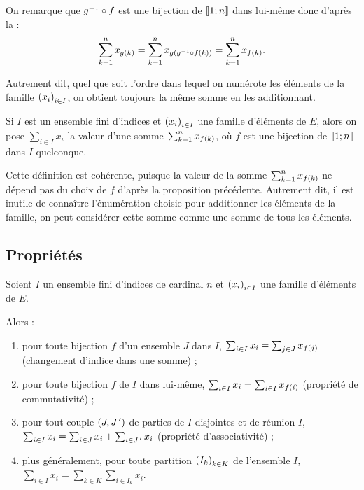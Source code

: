 \begin{dem}
On remarque que \(g^{-1}\circ f\) est une bijection de \(\left\llbracket1;n\right\rrbracket\) dans lui-même donc d'après la  : \[\sum_{k=1}^nx_{g\left(k\right)}=\sum_{k=1}^nx_{g\left(g^{-1}\circ f\left(k\right)\right)}=\sum_{k=1}^nx_{f\left(k\right)}.\]
\end{dem}

Autrement dit, quel que soit l'ordre dans lequel on numérote les éléments de la famille \(\left(x_i\right)_{i\in I}\), on obtient toujours la même somme en les additionnant.

\begin{defi}
Si \(I\) est un ensemble fini d'indices et \(\left(x_i\right)_{i\in I}\) une famille d'éléments de \(E\), alors on pose \(\sum_{i\in I}x_i\) la valeur d'une somme \(\sum_{k=1}^nx_{f\left(k\right)}\), où \(f\) est une bijection de \(\left\llbracket1;n\right\rrbracket\) dans \(I\) quelconque.
\end{defi}

Cette définition est cohérente, puisque la valeur de la somme \(\sum_{k=1}^nx_{f\left(k\right)}\) ne dépend pas du choix de \(f\) d'après la proposition précédente. Autrement dit, il est inutile de connaître l'énumération choisie pour additionner les éléments de la famille, on peut considérer cette somme comme une somme  de tous les éléments.

\subsection{Propriétés}

\begin{prop}
Soient \(I\) un ensemble fini d'indices de cardinal \(n\) et \(\left(x_i\right)_{i\in I}\) une famille d'éléments de \(E\).

Alors :

\begin{enumerate}
    \item pour toute bijection \(f\) d'un ensemble \(J\) dans \(I\), \(\sum_{i\in I}x_i=\sum_{j\in J}x_{f\left(j\right)}\) (changement d'indice dans une somme) ; \\
    \item pour toute bijection \(f\) de \(I\) dans lui-même, \(\sum_{i\in I}x_i=\sum_{i\in I}x_{f\left(i\right)}\) (propriété de commutativité) ; \\
    \item pour tout couple \(\left(J,J^{\,\prime}\right)\) de parties de \(I\) disjointes et de réunion \(I\), \(\sum_{i\in I}x_i=\sum_{i\in J}x_i+\sum_{i\in J^{\,\prime}}x_i\) (propriété d'associativité) ; \\
    \item plus généralement, pour toute partition \(\left(I_k\right)_{k\in K}\) de l'ensemble \(I\), \(\sum_{i\in I}x_i=\sum_{k\in K}\sum_{i\in I_k}x_i\).
\end{enumerate}
\end{prop}

